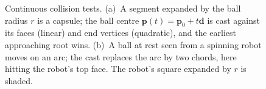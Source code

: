 \begin{figure}[htbp]
{}
    \caption{Continuous collision tests.  (a)~A segment expanded by the ball radius $r$
    is a capsule; the ball centre $\mathbf p(t)=\mathbf p_0+t\mathbf d$ is cast against its
    faces (linear) and end vertices (quadratic), and the earliest approaching root wins.
    (b)~A ball at rest seen from a spinning robot moves on an arc; the cast replaces the
    arc by two chords, here hitting the robot's top face.  The robot's square expanded by $r$ is shaded.}
    \label{fig:sweep}
\end{figure}
